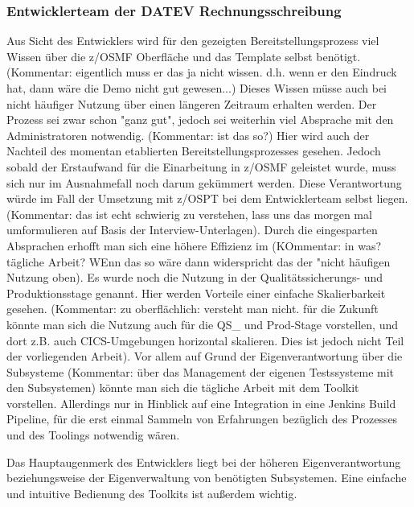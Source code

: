 \subsubsection{Entwicklerteam der DATEV Rechnungsschreibung}
Aus Sicht des Entwicklers wird für den gezeigten Bereitstellungsprozess viel Wissen über die z/OSMF Oberfläche und das Template selbst benötigt. (Kommentar: eigentlich muss er das ja nicht wissen. d.h. wenn er den Eindruck hat, dann wäre die Demo nicht gut gewesen...)
Dieses Wissen müsse auch bei nicht häufiger Nutzung über einen längeren Zeitraum erhalten werden.
Der Prozess sei zwar schon "ganz gut", jedoch sei weiterhin viel Absprache mit den Administratoren notwendig. (Kommentar: ist das so?)
Hier wird auch der Nachteil des momentan etablierten Bereitstellungsprozesses gesehen.
Jedoch sobald der Erstaufwand für die Einarbeitung in z/OSMF geleistet wurde, muss sich nur im Ausnahmefall noch darum gekümmert werden.
Diese Verantwortung würde im Fall der Umsetzung mit z/OSPT bei dem Entwicklerteam selbst liegen. (Kommentar: das ist echt schwierig zu verstehen, lass uns das morgen mal umformulieren auf Basis der Interview-Unterlagen).
Durch die eingesparten Absprachen erhofft man  sich eine höhere Effizienz im  (KOmmentar: in was? tägliche Arbeit? WEnn das so wäre dann widerspricht das der "nicht häufigen Nutzung oben).
Es wurde noch die Nutzung in der Qualitätssicherungs- und Produktionsstage genannt.
Hier werden Vorteile einer einfache Skalierbarkeit gesehen. (Kommentar: zu oberflächlich: versteht man nicht. für die Zukunft könnte man sich die Nutzung auch für die QS_ und Prod-Stage vorstellen, und dort z.B. auch CICS-Umgebungen horizontal skalieren. Dies ist jedoch nicht Teil der vorliegenden Arbeit).
Vor allem auf Grund der Eigenverantwortung über die Subsysteme (Kommentar: über das Management der eigenen Testssysteme mit den Subsystemen) könnte man sich die tägliche Arbeit mit dem Toolkit vorstellen.
Allerdings nur in Hinblick auf eine Integration in eine Jenkins Build Pipeline, für die erst einmal Sammeln von Erfahrungen bezüglich des Prozesses und des Toolings notwendig wären.

Das Hauptaugenmerk des Entwicklers liegt bei der höheren Eigenverantwortung beziehungsweise der Eigenverwaltung von benötigten Subsystemen.
Eine einfache und intuitive Bedienung des Toolkits ist außerdem wichtig.

